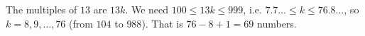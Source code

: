 The multiples of $13$ are $13k$. We need $100\le13k\le999$, i.e. $7.7\ldots\le k\le76.8\ldots$, so $k=8,9,\dots,76$ (from $104$ to $988$). That is $76-8+1=\boxed{69}$ numbers.
